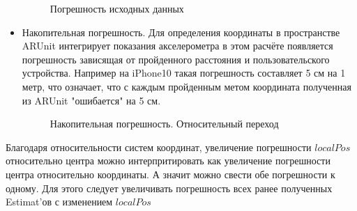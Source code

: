 \documentclass[a4paper, 11pt, titlepage]{article}
\begin{document}
\begin{itemize}
\begin{figure}[H]
\begin{tikzpicture}[scale=0.8]
              \end{tikzpicture}
              \caption{Погрешность исходных данных}
             \end{figure}
             \item Накопительная погрешность. Для определения координаты в пространстве ARUnit интегрирует показания акселерометра
             в этом расчёте появляется погрешность зависящая от пройденного расстояния и пользовательского устройства. 
             Например на iPhone10 такая погрешность составляет 5 см на 1 метр, что означает, что с каждым пройденным метом 
             координата полученная из ARUnit "ошибается" на 5 см.
             \begin{figure}[H]
              \centering
              \caption{Накопительная погрешность. Относительный переход}
             \end{figure}
          \end{itemize}
          Благодаря относительности систем координат, увеличение погрешности $localPos$ относительно центра можно 
          интерпритировать как увеличение погрешности центра относительно координаты. А значит можно свести обе погрешности к одному.
          Для этого следует увеличивать погрешность всех ранее полученных Estimat'ов с изменением $localPos$
\end{document}
